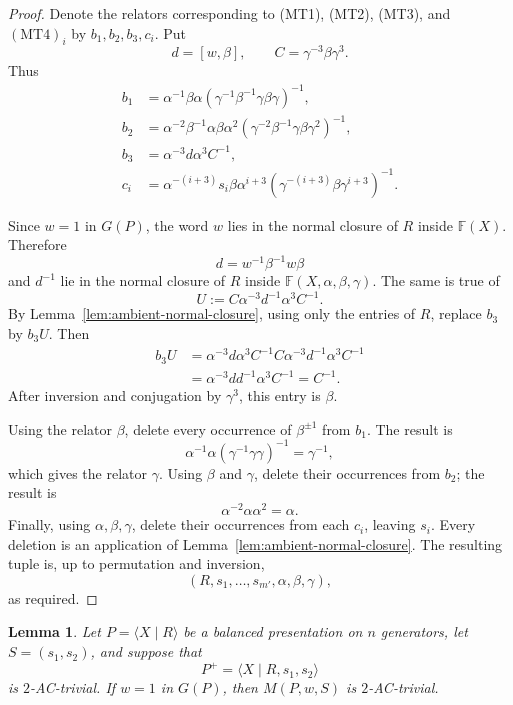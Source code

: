 \documentclass[a4paper,11pt,reqno]{amsart}
\newtheorem{lemma}[theorem]{Lemma}
\theoremstyle{definition}
\theoremstyle{remark}
\newcommand{\Free}{\mathbb F}
\begin{document}
	\begin{proof}
		Denote the relators corresponding to (MT1), (MT2), (MT3), and
		$(\mathrm{MT4})_i$ by $b_1,b_2,b_3,c_i$. Put
		\[
		d=[w,\beta],
		\qquad
		C=\gamma^{-3}\beta\gamma^3.
		\]
		Thus
		\[
		\begin{aligned}
			b_1&=\alpha^{-1}\beta\alpha
			\left(\gamma^{-1}\beta^{-1}\gamma\beta\gamma\right)^{-1},\\
			b_2&=\alpha^{-2}\beta^{-1}\alpha\beta\alpha^2
			\left(\gamma^{-2}\beta^{-1}\gamma\beta\gamma^2\right)^{-1},\\
			b_3&=\alpha^{-3}d\alpha^3C^{-1},\\
			c_i&=\alpha^{-(i+3)}s_i\beta\alpha^{i+3}
			\left(\gamma^{-(i+3)}\beta\gamma^{i+3}\right)^{-1}.
		\end{aligned}
		\]
		
		Since $w=1$ in $G(P)$, the word $w$ lies in the normal closure of $R$
		inside $\Free(X)$. Therefore
		\[
		d=w^{-1}\beta^{-1}w\beta
		\]
		and $d^{-1}$ lie in the normal closure of $R$ inside
		$\Free(X,\alpha,\beta,\gamma)$. The same is true of
		\[
		U:=C\alpha^{-3}d^{-1}\alpha^3C^{-1}.
		\]
		By Lemma~\ref{lem:ambient-normal-closure}, using only the entries of $R$, replace
		$b_3$ by $b_3U$. Then
		\[
		\begin{aligned}
			b_3U
			&=\alpha^{-3}d\alpha^3C^{-1}
			C\alpha^{-3}d^{-1}\alpha^3C^{-1}\\
			&=\alpha^{-3}dd^{-1}\alpha^3C^{-1}
			=C^{-1}.
		\end{aligned}
		\]
		After inversion and conjugation by $\gamma^3$, this entry is $\beta$.
		
		Using the relator $\beta$, delete every occurrence of
		$\beta^{\pm1}$ from $b_1$. The result is
		\[
		\alpha^{-1}\alpha(\gamma^{-1}\gamma\gamma)^{-1}=\gamma^{-1},
		\]
		which gives the relator $\gamma$. Using $\beta$ and $\gamma$, delete
		their occurrences from $b_2$; the result is
		\[
		\alpha^{-2}\alpha\alpha^2=\alpha.
		\]
		Finally, using $\alpha,\beta,\gamma$, delete their occurrences from each
		$c_i$, leaving $s_i$. Every deletion is an application of
		Lemma~\ref{lem:ambient-normal-closure}. The resulting tuple is, up to
		permutation and inversion,
		\[
		(R,s_1,\dots,s_{m'},\alpha,\beta,\gamma),
		\]
		as required.
	\end{proof}
	
	\begin{lemma}
		\label{lem:AC-control}
		Let $P=\langle X\mid R\rangle$ be a balanced presentation on $n$
		generators, let $S=(s_1,s_2)$, and suppose that
		\[
		P^+=\langle X\mid R,s_1,s_2\rangle
		\]
		is $2$-AC-trivial. If $w=1$ in $G(P)$, then $M(P,w,S)$ is
		$2$-AC-trivial.
	\end{lemma}
	
\end{document}
